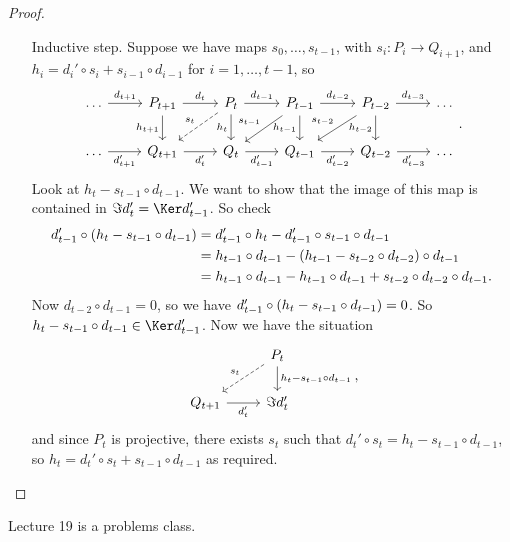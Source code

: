 \begin{proof}
\begin{enumerate}
\begin{itemize}[leftmargin=1in]
\item[Inductive step.] Suppose we have maps $ s_0, \dots, s_{t - 1} $, with $ s_i : P_i \to Q_{i + 1} $, and $ h_i = d_i' \circ s_i + s_{i - 1} \circ d_{i - 1} $ for $ i = 1, \dots, t - 1 $, so
$$
\begin{tikzcd}
\dots \arrow{r}{d_{t + 1}} & P_{t + 1} \arrow{r}{d_t} \arrow[swap]{d}{h_{t + 1}} & P_t \arrow{r}{d_{t - 1}} \arrow[dashed, swap]{dl}{s_t} \arrow[swap]{d}{h_t} & P_{t - 1} \arrow{r}{d_{t - 2}} \arrow[swap]{dl}{s_{t - 1}} \arrow[swap]{d}{h_{t - 1}} & P_{t - 2} \arrow{r}{d_{t - 3}} \arrow[swap]{dl}{s_{t - 2}} \arrow[swap]{d}{h_{t - 2}} & \dots \\
\dots \arrow[swap]{r}{d_{t + 1}'} & Q_{t + 1} \arrow[swap]{r}{d_t'} & Q_t \arrow[swap]{r}{d_{t - 1}'} & Q_{t - 1} \arrow[swap]{r}{d_{t - 2}'} & Q_{t - 2} \arrow[swap]{r}{d_{t - 3}'} & \dots
\end{tikzcd}.
$$
Look at $ h_t - s_{t - 1} \circ d_{t - 1} $. We want to show that the image of this map is contained in $ \Im d_t' = \Ker d_{t - 1}' $. So check
\begin{align*}
d_{t - 1}' \circ \br{h_t - s_{t - 1} \circ d_{t - 1}}
& = d_{t - 1}' \circ h_t - d_{t - 1}' \circ s_{t - 1} \circ d_{t - 1} \\
& = h_{t - 1} \circ d_{t - 1} - \br{h_{t - 1} - s_{t - 2} \circ d_{t - 2}} \circ d_{t - 1} \\
& = h_{t - 1} \circ d_{t - 1} - h_{t - 1} \circ d_{t - 1} + s_{t - 2} \circ d_{t - 2} \circ d_{t - 1}.
\end{align*}
Now $ d_{t - 2} \circ d_{t - 1} = 0 $, so we have $ d_{t - 1}' \circ \br{h_t - s_{t - 1} \circ d_{t - 1}} = 0 $. So $ h_t - s_{t - 1} \circ d_{t - 1} \in \Ker d_{t - 1}' $. Now we have the situation
$$
\begin{tikzcd}
& P_t \arrow[dashed, swap]{dl}{s_t} \arrow{d}{h_t - s_{t - 1} \circ d_{t - 1}} \\
Q_{t + 1} \arrow[swap]{r}{d_t'} & \Im d_t'
\end{tikzcd},
$$
and since $ P_t $ is projective, there exists $ s_t $ such that $ d_t' \circ s_t = h_t - s_{t - 1} \circ d_{t - 1} $, so $ h_t = d_t' \circ s_t + s_{t - 1} \circ d_{t - 1} $ as required.
\end{itemize}
\end{enumerate}
\end{proof}


Lecture 19 is a problems class.

\pagebreak

